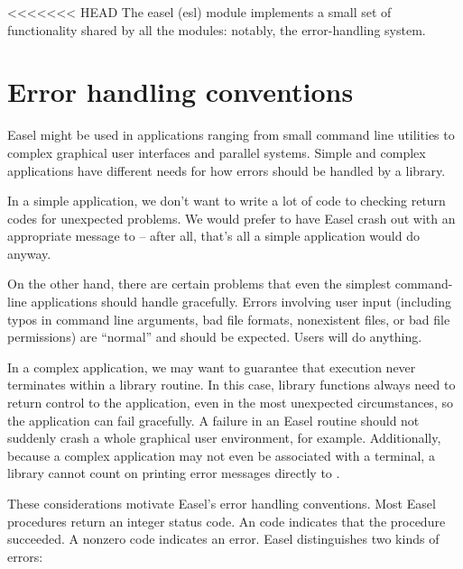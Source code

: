 <<<<<<< HEAD
The easel (esl) module implements a small set of functionality shared
by all the modules: notably, the error-handling system.

\section{Error handling conventions}

Easel might be used in applications ranging from small command line
utilities to complex graphical user interfaces and parallel
systems. Simple and complex applications have different needs for how
errors should be handled by a library.

In a simple application, we don't want to write a lot of code to
checking return codes for unexpected problems. We would prefer to have
Easel crash out with an appropriate message to  -- after
all, that's all a simple application would do anyway.

On the other hand, there are certain problems that even the simplest
command-line applications should handle gracefully. Errors involving
user input (including typos in command line arguments, bad file
formats, nonexistent files, or bad file permissions) are ``normal''
and should be expected. Users will do anything.

In a complex application, we may want to guarantee that execution
never terminates within a library routine. In this case, library
functions always need to return control to the application, even in
the most unexpected circumstances, so the application can fail
gracefully. A failure in an Easel routine should not suddenly crash a
whole graphical user environment, for example. Additionally, because a
complex application may not even be associated with a terminal, a
library cannot count on printing error messages directly to
.

These considerations motivate Easel's error handling conventions.
Most Easel procedures return an integer status code. An 
code indicates that the procedure succeeded. A nonzero code indicates
an error. Easel distinguishes two kinds of errors:

